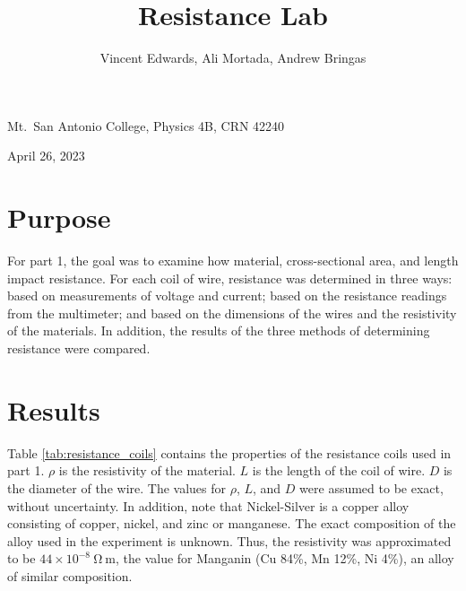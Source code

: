 \documentclass[12pt]{iopart} %
\gdef\sci#1#2{#1 \times 10^{#2}}
\gdef\units#1{~\mathrm{#1}}
\begin{document}
\title{Resistance Lab}
\author{Vincent Edwards, Ali Mortada, Andrew Bringas}
\vspace{10pt}
\begin{indented}
  \item[]Mt.~San Antonio College, Physics 4B, CRN 42240
  \item[]April 26, 2023
\end{indented}
\newpage

\section{Purpose}

For part 1, the goal was to examine how material, cross-sectional area, and length impact resistance.
For each coil of wire, resistance was determined in three ways: based on measurements of voltage and current; based on the resistance readings from the multimeter; and based on the dimensions of the wires and the resistivity of the materials.
In addition, the results of the three methods of determining resistance were compared.

\section{Results}

Table \ref{tab:resistance_coils} contains the properties of the resistance coils used in part 1.
$\rho$ is the resistivity of the material.
$L$ is the length of the coil of wire.
$D$ is the diameter of the wire.
The values for $\rho$, $L$, and $D$ were assumed to be exact, without uncertainty.
In addition, note that Nickel-Silver is a copper alloy consisting of copper, nickel, and zinc or manganese.
The exact composition of the alloy used in the experiment is unknown.
Thus, the resistivity was approximated to be $\sci{44}{-8} \units{\Omega~m}$, the value for Manganin (Cu 84\%, Mn 12\%, Ni 4\%), an alloy of similar composition.
\end{document}
